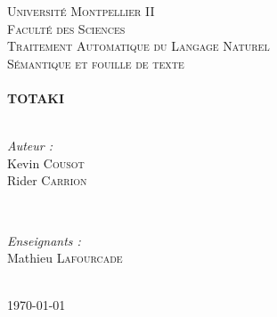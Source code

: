 \begin{titlepage}

\textsc{\LARGE Université Montpellier II \\ Faculté des Sciences}\\[1.5cm]
\textsc{\Large Traitement Automatique du Langage Naturel}\\[0.5cm]
\textsc{\large Sémantique et fouille de texte}\\[0.5cm]


\HRule \\[0.4cm]
{ \huge \bfseries TOTAKI}\\[0.4cm] 
\HRule \\[1.5cm]
 

\begin{minipage}{0.4\textwidth}
  \begin{flushleft} \large
    \emph{Auteur :}\\
    Kevin \textsc{Cousot}\\
    Rider \textsc{Carrion}
  \end{flushleft}
\end{minipage}
~
\begin{minipage}{0.4\textwidth}
  \begin{flushright} \large
    \emph{Enseignants :} \\
    Mathieu \textsc{Lafourcade}
  \end{flushright}
\end{minipage}\\[4cm]


{\large \today}\\[3cm]


\vfill 

\end{titlepage}
